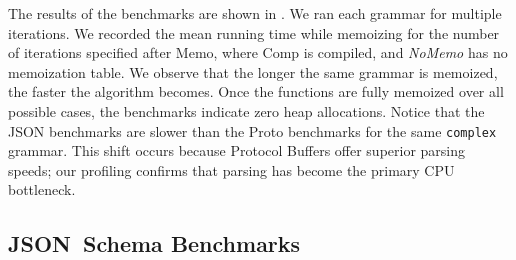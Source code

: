 \documentclass[acmsmall,%
  screen,%
  authorversion, %
  nonacm%
]{acmart}
\newcommand{\JSONSchema}{%
  JSON~Schema\xspace%
}
\newcommand{\JSON}{\ac{JSON}\xspace}
\begin{document}
The results of the benchmarks are shown in .
We ran each grammar for multiple iterations.
We recorded the mean running time while memoizing for the number of iterations specified after Memo, where Comp is compiled, and \emph{NoMemo} has no memoization table.
We observe that the longer the same grammar is memoized, the faster the algorithm becomes.
Once the functions are fully memoized over all possible cases, the benchmarks indicate zero heap allocations.
Notice that the \JSON benchmarks are slower than the Proto benchmarks for the same \lstinline{complex} grammar.
This shift occurs because Protocol Buffers offer superior parsing speeds; our profiling confirms that parsing has become the primary CPU bottleneck.

\subsection{\JSONSchema Benchmarks}
\end{document}
